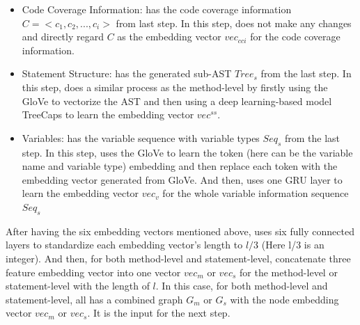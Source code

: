 \begin{itemize}
	\item Code Coverage Information: \tool has the code coverage information $C = <c_1, c_2, ..., c_i>$ from last step. In this step, \tool does not make any changes and directly regard $C$ as the embedding vector $vec_{cci}$ for the code coverage information.
	
	\item Statement Structure: \tool has the generated sub-AST $Tree_s$ from the last step. In this step, \tool does a similar process as the method-level by firstly using the GloVe to vectorize the AST and then using a deep learning-based model TreeCaps to learn the embedding vector $vec^{ss}$.
	
	\item Variables: \tool has the variable sequence with variable types $Seq_s$ from the last step. In this step, \tool uses the GloVe to learn the token (here can be the variable name and variable type) embedding and then replace each token with the embedding vector generated from GloVe. And then, \tool uses one GRU layer to learn the embedding vector $vec_{v}$ for the whole variable information sequence $Seq_s$
\end{itemize}

After having the six embedding vectors mentioned above, \tool uses six fully connected layers to standardize each embedding vector's length to $l/3$ (Here l/3 is an integer). And then, for both method-level and statement-level, \tool concatenate three feature embedding vector into one vector $vec_{m}$ or $vec_{s}$ for the method-level or statement-level with the length of $l$. In this case, for both method-level and statement-level, \tool all has a combined graph $G_m$ or $G_s$ with the node embedding vector $vec_{m}$ or $vec_{s}$. It is the input for the next step.